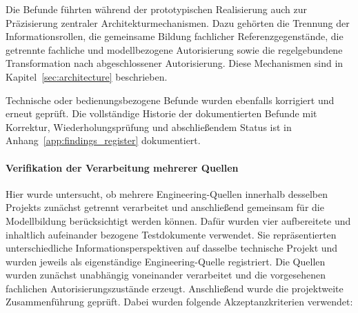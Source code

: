 Die Befunde führten während der prototypischen Realisierung auch zur
Präzisierung zentraler Architekturmechanismen. Dazu gehörten die Trennung der
Informationsrollen, die gemeinsame Bildung fachlicher Referenzgegenstände,
die getrennte fachliche und modellbezogene Autorisierung sowie die
regelgebundene Transformation nach abgeschlossener Autorisierung. Diese
Mechanismen sind in Kapitel~\ref{sec:architecture} beschrieben.

Technische oder bedienungsbezogene Befunde wurden ebenfalls korrigiert und
erneut geprüft. Die vollständige Historie der dokumentierten Befunde mit
Korrektur, Wiederholungsprüfung und abschließendem Status ist in
Anhang~\ref{app:findings_register} dokumentiert.
\FloatBarrier
\paragraph{Verifikation der Verarbeitung mehrerer Quellen}

Hier wurde untersucht, ob mehrere Engineering-Quellen innerhalb desselben
Projekts zunächst getrennt verarbeitet und anschließend gemeinsam für die
Modellbildung berücksichtigt werden können. Dafür wurden vier aufbereitete
und inhaltlich aufeinander bezogene Testdokumente verwendet. Sie
repräsentierten unterschiedliche Informationsperspektiven auf dasselbe
technische Projekt und wurden jeweils als eigenständige Engineering-Quelle
registriert.
\newpage
Die Quellen wurden zunächst unabhängig voneinander verarbeitet und die
vorgesehenen fachlichen Autorisierungszustände erzeugt. Anschließend wurde
die projektweite Zusammenführung geprüft. Dabei wurden folgende
Akzeptanzkriterien verwendet:

